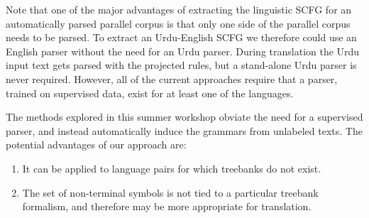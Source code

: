 Note that one of the major advantages of extracting the linguistic SCFG for an automatically parsed parallel corpus is that only one side of the parallel corpus needs to be parsed.  To extract an Urdu-English SCFG we therefore could use an English parser without the need for an Urdu parser.  During translation the Urdu input text gets parsed with the projected rules, but a stand-alone Urdu parser is never required. 
However, all of the current approaches require that a parser, trained on supervised data, exist for at least one of the languages.  

The methods explored in this summer workshop obviate the need for a supervised parser, and instead automatically induce the grammars from unlabeled texts.  The potential advantages of our approach are:
\begin{enumerate}
\item It can be applied to language pairs for which treebanks do not exist.
\item The set of non-terminal symbols is not tied to a particular treebank formalism, and therefore may be more appropriate for translation.
\end{enumerate} 


